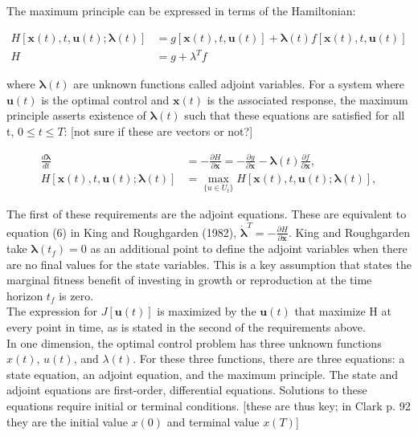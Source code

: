\documentclass[12pt, oneside]{article}   	%
\begin{document}
\noindent The maximum principle can be expressed in terms of the Hamiltonian:

\begin{align}
H[\bm{x}(t), t, \bm{u}(t); \bm{\lambda}(t)] & = g[\bm{x}(t), t, \bm{u}(t)] + \bm{\lambda}(t) f[\bm{x}(t), t, \bm{u}(t)] \label{eq:1}  \\
H & = g + \lambda^T f \label{eq:1}  
\end{align}


\noindent where $\bm{\lambda}(t)$ are unknown functions called adjoint variables. For a system where $\bm{u}(t)$ is the optimal control and $\bm{x}(t)$ is the associated response, the maximum principle asserts existence of $\bm{\lambda}(t)$ such that these equations are satisfied for all t, $0\leq t \leq T$: [not sure if these are vectors or not?]

\begin{align}
\frac{d\bm{\lambda}}{dt} & = - \frac{ \partial H}{\partial \bm{x}} = - \frac{ \partial g}{\partial \bm{x}} - \bm{\lambda}(t) \frac{ \partial f}{\partial \bm{x}} \label{eq:1}, \\
H[\bm{x}(t), t, \bm{u}(t); \bm{\lambda}(t)] & = \max_{\{u \in U_t\}} H[\bm{x}(t), t, \bm{u}(t); \bm{\lambda}(t)] \label{eq:1},
\end{align}

\noindent The first of these requirements are the adjoint equations. These are equivalent to equation (6) in King and Roughgarden (1982), $\dot{\bm{\lambda}}^T =  - \frac{ \partial H}{\partial \bm{x}} $. King and Roughgarden take $\bm{\lambda}(t_f)=0$ as an additional point to define the adjoint variables when there are no final values for the state variables. This is a key assumption that states the marginal fitness benefit of investing in growth or reproduction at the time horizon $t_f$ is zero. \\

\noindent The expression for $J[\bm{u}(t)]$ is maximized by the $ \bm{u}(t) $ that maximize H at every point in time, as is stated in the second of the requirements above. \\

\noindent In one dimension, the optimal control problem has three unknown functions $x(t)$, $u(t)$, and $\lambda(t)$. For these three functions, there are three equations: a state equation, an adjoint equation, and the maximum principle. The state and adjoint equations are first-order, differential equations. Solutions to these equations require initial or terminal conditions. [these are thus key; in Clark p. 92 they are the initial value $x(0)$ and terminal value $x(T)$] \\
\end{document}
